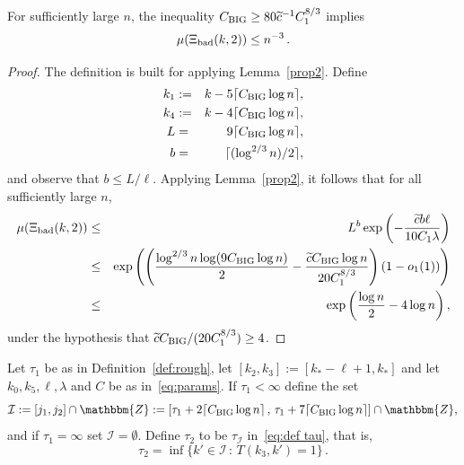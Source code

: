 \documentclass[final,12pt]{colt2018} %
\newcommand{\Z}{\mathbbm{Z}}
\newcommand{\1}{\mathbf{1}}
\def\cI{\mathcal{I}}
\newcommand{\wt}{\widetilde}
\def\ct{{\wt c}}
\def\chuge{C_{\rm BIG}}
\def\bad{{\Xi_{\rm bad}}}
\begin{document}
\begin{lemma} \label{lem:bad 2}
	For sufficiently large $n$, the inequality $\chuge \geq 80
	\ct^{-1} C_1^{8/3}$ implies
	$$\mu (\bad (k,2)) \leq n^{-3} \, .$$
\end{lemma}

\begin{proof}
	The definition is built for applying Lemma~\ref{prop2}. Define
	\begin{eqnarray*}
		k_1 & := & k - 5 \lceil \chuge \log n \rceil, \\
		k_4 & := & k - 4 \lceil \chuge \log n \rceil, \\
		L & = & 9\lceil \chuge \log n \rceil, \\
		b & = & \lceil (\log^{2/3} n)  / 2 \rceil,
	\end{eqnarray*}
	and observe that $b \leq L/\ell$. Applying Lemma~\ref{prop2}, it follows that for all sufficiently large $n$,
	\begin{eqnarray*}
		\mu (\bad(k,2)) & \leq &
		L^b \exp \left (- \frac{\ct b \ell}{10 C_1 \lambda} \right ) \\
		& \leq & \exp \left (\left ( \frac{\log^{2/3} n \log (9 \chuge \log n)}{2}
		- \frac{\ct \chuge \log n}{20 C_1^{8/3}} \right )(1-o_1(1))\right ) \\
		& \leq & \exp \left ( \frac{\log n}{2} - 4 \log n \right ),
	\end{eqnarray*}
	under the hypothesis that $\ct \chuge / (20 C_1^{8/3}) \geq 4$.
\end{proof}

\begin{definition} \label{def:tau_2}
	Let $\tau_1$ be as in Definition~\ref{def:rough}, let $[k_2,k_3] :=
	[k_* - \ell + 1 , k_*]$ and let $k_0, k_5, \ell, \lambda$ and $C$
	be as in~\eqref{eq:params}.  If $\tau_1<\infty$ define the set
	$$\cI := [j_1 , j_2]\cap\Z := [\tau_1 + 2 \lceil \chuge \log n \rceil \, , \,
	\tau_1 + 7 \lceil\chuge  \log n \rceil]\cap\Z,$$
	and if $\tau_1=\infty$ set $\cI=\emptyset$. Define $\tau_2$ to be $\tau_{\cI}$ in~\eqref{eq:def tau}, that is,
	$$\tau_2 = \inf\{ k' \in \cI \, : \, T(k_3 , k') = 1 \} \, .$$
\end{definition}
\end{document}
